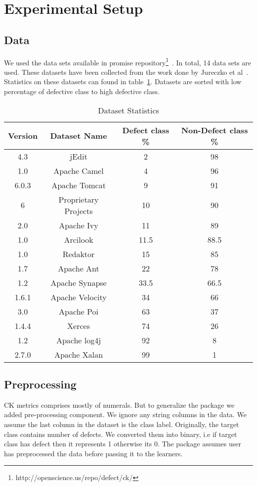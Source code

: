 \documentclass[conference]{IEEEtran}
\begin{document}
\section{Experimental Setup}

\subsection{\textbf{Data}}
 We used the data sets available in promise repository\footnote{http://openscience.us/repo/defect/ck/}~\cite{promiserepo}. In total, 14 data sets are used. These datasets have been collected from the work done by Jureczko et al~\cite{jureczko2010towards}. Statistics on these datasets can found in table~\ref{tb:dataset}. Datasets are sorted with low percentage of defective class to high defective class.
 
 \begin{table}[!htbp]
\begin{center}
\begin{tabular}{|c|c|c|c|}
\hline 
\textbf{Version} & \textbf{Dataset Name} &  \textbf{Defect class \%} & \textbf{Non-Defect class \%}\\[0.5ex]
\hline
4.3 & jEdit & 2 & 98 \\
\hline
1.0 & Apache Camel & 4 & 96 \\ 
\hline
6.0.3 & Apache Tomcat & 9 & 91 \\
\hline
6 & Proprietary Projects & 10 & 90 \\
\hline
2.0 & Apache Ivy & 11 & 89 \\ 
\hline
1.0 & Arcilook & 11.5 & 88.5\\
\hline
1.0 & Redaktor & 15 & 85 \\
\hline
1.7 & Apache Ant & 22 & 78 \\ 
\hline
1.2 & Apache Synapse & 33.5 & 66.5 \\
\hline
1.6.1 & Apache Velocity & 34 & 66 \\
\hline
3.0 & Apache Poi & 63 & 37 \\
\hline
1.4.4 & Xerces & 74 & 26 \\
\hline
1.2 & Apache log4j & 92 & 8 \\
\hline
2.7.0 & Apache Xalan & 99 & 1 \\
\hline
\end{tabular}
\end{center}
\caption{Dataset Statistics}
\label{tb:dataset}
\end{table}

\subsection{\textbf{Preprocessing}}
CK metrics comprises mostly of numerals. But to generalize the package we added pre-processing component. We ignore any string columns in the data. We assume the last column in the dataset is the class label. Originally, the target class contains number of defects. We converted them into binary, i.e if target class has defect then it represents 1 otherwise its 0. The package assumes user has preprocessed the data before passing it to the learners. 
\end{document}

